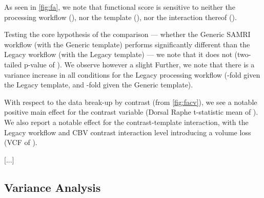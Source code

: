 As seen in \cref{fig:fa}, we note that functional score is sensitive to neither
the processing workflow
(),
nor the template
(),
nor the interaction thereof
().

Testing the core hypothesis of the comparison ---
whether the Generic SAMRI workflow (with the Generic template) performs significantly different than the Legacy workflow (with the Legacy template) ---
we note that it does not
(two-tailed p-value of
).
We observe however a slight
Further, we note that there is a variance increase in all conditions for the Legacy processing workflow
(-fold given the Legacy template, and -fold given the Generic template).

With respect to the data break-up by contrast (from \cref{fig:facv}), we see a notable positive main effect for the contrast variable
(Dorsal Raphe t-statistic mean of
).
We also report a notable effect for the contrast-template interaction, with the Legacy workflow and CBV contrast interaction level introducing a volume loss
(VCF of
).


\begin{center}
        \textcolor{lg}{[...]}
\end{center}

\subsection{Variance Analysis}

